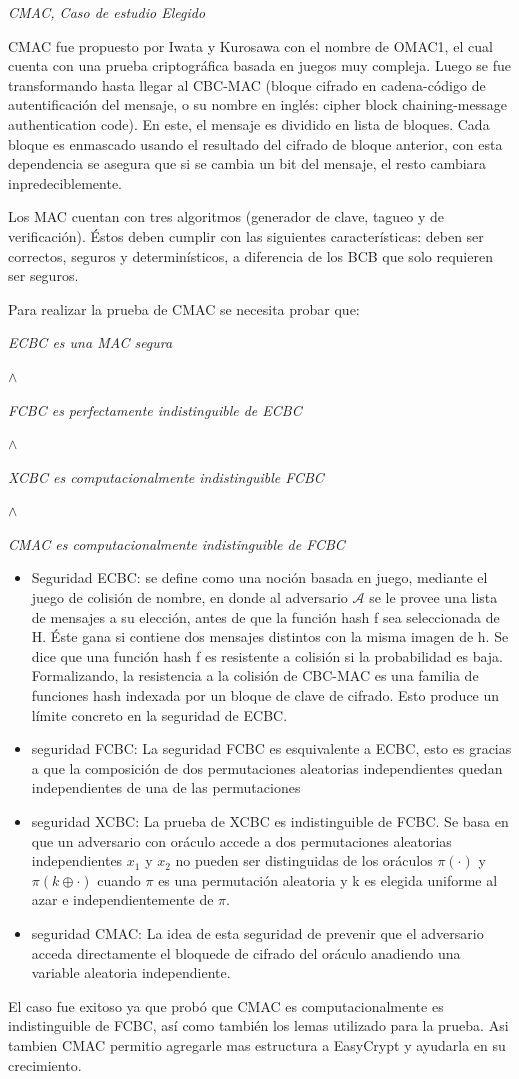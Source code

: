 \documentclass[runningheads,a4paper]{llncs}
\begin{document}
\centerline{\emph{CMAC, Caso de estudio Elegido}}
CMAC fue propuesto por Iwata y Kurosawa con el nombre de OMAC1, el cual cuenta con una prueba criptográfica basada en juegos muy compleja. Luego se fue transformando hasta llegar al CBC-MAC (bloque cifrado en cadena-código de autentificación del mensaje, o su nombre en inglés: cipher block chaining-message authentication code). En este, el mensaje es dividido en lista de bloques. Cada bloque es enmascado usando el resultado del cifrado de bloque anterior, con esta dependencia se asegura que si se cambia un bit  del mensaje, el resto cambiara inpredeciblemente.

Los MAC cuentan con tres algoritmos (generador de clave, tagueo y de verificación). Éstos deben cumplir con las siguientes características: deben ser correctos, seguros y determinísticos, a diferencia de los BCB que solo requieren ser seguros.

Para realizar la prueba de CMAC se necesita probar que:

\centerline{\emph{ECBC es una MAC segura}}
\centerline{$\land$}
\centerline{\emph{FCBC es perfectamente indistinguible de ECBC}}
\centerline{$\land$}
\centerline{\emph{XCBC es computacionalmente indistinguible FCBC}}
\centerline{$\land$}
\centerline{\emph{CMAC es computacionalmente indistinguible de FCBC}}

\begin{itemize}
	\item Seguridad ECBC: se define como una noción basada en juego, mediante el juego de colisión de nombre, en donde al adversario $\mathcal{A}$ se le provee una lista de mensajes a su elección, antes de que la función hash f sea seleccionada de H. Éste gana si contiene dos mensajes distintos con la misma imagen de h. Se dice que una función hash f es resistente a colisión si la probabilidad es baja. Formalizando, la resistencia a la colisión de CBC-MAC es una familia de funciones hash indexada por un bloque de clave de cifrado. Esto produce un límite concreto en la seguridad de ECBC.
	\item seguridad FCBC: La seguridad FCBC es esquivalente a ECBC, esto es gracias a que la composición de dos permutaciones aleatorias independientes quedan independientes de una de las permutaciones 
	\item seguridad XCBC: La prueba de XCBC es indistinguible de FCBC. Se basa en que un adversario con oráculo accede a dos permutaciones aleatorias independientes $x_1$ y $x_2$ no pueden ser distinguidas de los oráculos $\pi (\cdot)$ y $\pi (k \oplus \cdot)$ cuando $\pi$ es una permutación aleatoria y k es elegida uniforme al azar e independientemente de $\pi$.
	\item seguridad CMAC: La idea de esta seguridad de prevenir que el adversario acceda directamente el bloquede de cifrado del oráculo anadiendo una variable aleatoria independiente.
\end{itemize}
El caso fue exitoso ya que probó que CMAC es computacionalmente es indistinguible de FCBC, así como también los lemas utilizado para la prueba. Asi tambien CMAC permitio agregarle mas estructura a EasyCrypt y ayudarla en su crecimiento.\cite{article5}
\end{document}

